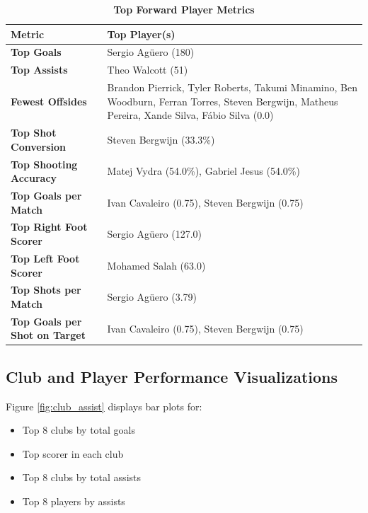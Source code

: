 \documentclass[12pt,a4paper]{article}
\begin{document}
\begin{table}[H]
\centering
\renewcommand{\arraystretch}{1.3}
\caption{\textcolor{primary}{\textbf{Top Forward Player Metrics}}}
\label{tab:forwards}
\begin{tabular}{@{}>{\bfseries\color{primary}}L{5cm} L{9cm}@{}}
\toprule
\textbf{\textcolor{primary}{Metric}} & \textbf{\textcolor{primary}{Top Player(s)}} \\
\midrule
{} Top Goals & Sergio Agüero (180) \\
Top Assists & Theo Walcott (51) \\
 Fewest Offsides & Brandon Pierrick, Tyler Roberts, Takumi Minamino, Ben Woodburn, Ferran Torres, Steven Bergwijn, Matheus Pereira, Xande Silva, Fábio Silva (0.0) \\
Top Shot Conversion & \textcolor{accent}{Steven Bergwijn (33.3\%)} \\
 Top Shooting Accuracy & Matej Vydra (54.0\%), Gabriel Jesus (54.0\%) \\
Top Goals per Match & Ivan Cavaleiro (0.75), Steven Bergwijn (0.75) \\
 Top Right Foot Scorer & Sergio Agüero (127.0) \\
Top Left Foot Scorer & Mohamed Salah (63.0) \\
 Top Shots per Match & Sergio Agüero (3.79) \\
Top Goals per Shot on Target & Ivan Cavaleiro (0.75), Steven Bergwijn (0.75) \\
\bottomrule
\end{tabular}
\end{table}

\subsection{Club and Player Performance Visualizations}

Figure \ref{fig:club_assist} displays bar plots for:
\begin{itemize}[leftmargin=1cm, label=\textcolor{secondary}{\faCaretRight}]
    \item Top 8 clubs by total goals
    \item Top scorer in each club
    \item Top 8 clubs by total assists
    \item Top 8 players by assists
\end{itemize}
\end{document}
